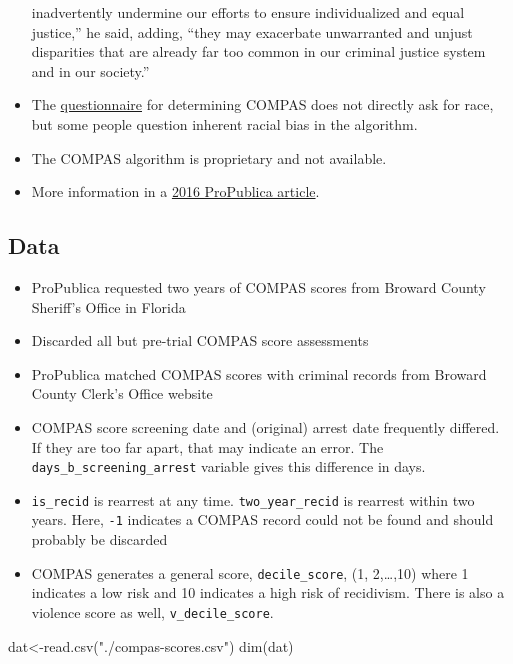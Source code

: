 \documentclass[
]{article}
\newenvironment{Shaded}{\begin{snugshade}}{\end{snugshade}}
\newcommand{\FunctionTok}[1]{\textcolor[rgb]{0.00,0.00,0.00}{#1}}
\newcommand{\NormalTok}[1]{#1}
\newcommand{\OtherTok}[1]{\textcolor[rgb]{0.56,0.35,0.01}{#1}}
\newcommand{\StringTok}[1]{\textcolor[rgb]{0.31,0.60,0.02}{#1}}
\begin{document}
\begin{itemize}
  inadvertently undermine our efforts to ensure individualized and equal
  justice,'' he said, adding, ``they may exacerbate unwarranted and
  unjust disparities that are already far too common in our criminal
  justice system and in our society.''
\item
  The
  \href{https://www.documentcloud.org/documents/2702103-Sample-Risk-Assessment-COMPAS-CORE.html}{questionnaire}
  for determining COMPAS does not directly ask for race, but some people
  question inherent racial bias in the algorithm.
\item
  The COMPAS algorithm is proprietary and not available.
\item
  More information in a
  \href{https://www.propublica.org/article/machine-bias-risk-assessments-in-criminal-sentencing}{2016
  ProPublica article}.
\end{itemize}

\hypertarget{data}{%
\subsection{Data}\label{data}}

\begin{itemize}
\item
  ProPublica requested two years of COMPAS scores from Broward County
  Sheriff's Office in Florida
\item
  Discarded all but pre-trial COMPAS score assessments
\item
  ProPublica matched COMPAS scores with criminal records from Broward
  County Clerk's Office website
\item
  COMPAS score screening date and (original) arrest date frequently
  differed. If they are too far apart, that may indicate an error. The
  \texttt{days\_b\_screening\_arrest} variable gives this difference in
  days.
\item
  \texttt{is\_recid} is rearrest at any time. \texttt{two\_year\_recid}
  is rearrest within two years. Here, \texttt{-1} indicates a COMPAS
  record could not be found and should probably be discarded
\item
  COMPAS generates a general score, \texttt{decile\_score}, (1,
  2,\ldots,10) where 1 indicates a low risk and 10 indicates a high risk
  of recidivism. There is also a violence score as well,
  \texttt{v\_decile\_score}.
\end{itemize}

\begin{Shaded}
\begin{Highlighting}[]
\NormalTok{dat}\OtherTok{\textless{}{-}}\FunctionTok{read.csv}\NormalTok{(}\StringTok{"./compas{-}scores.csv"}\NormalTok{)}
\FunctionTok{dim}\NormalTok{(dat)}
\end{Highlighting}
\end{Shaded}
\end{document}
